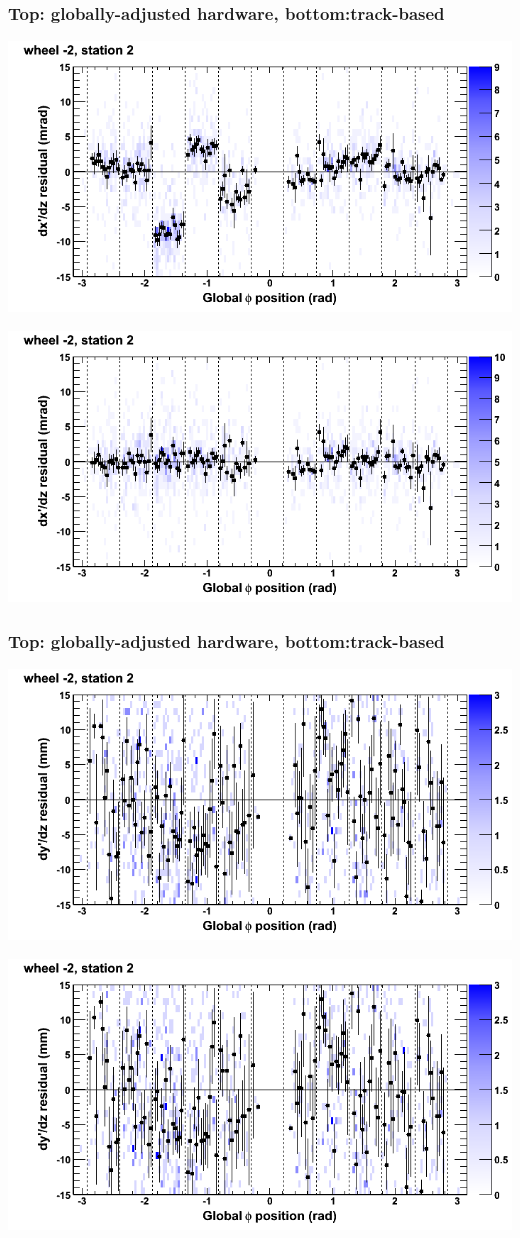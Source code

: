 \documentclass[compress]{beamer}
\begin{document}
\begin{frame}
\frametitle{Top: globally-adjusted hardware, bottom:track-based}
\includegraphics[width=0.7\linewidth]{NOV4_mapplots_HW/DTvsphi_st2whA_dxdz.png}

\includegraphics[width=0.7\linewidth]{NOV4_mapplots/DTvsphi_st2whA_dxdz.png}
\end{frame}

\begin{frame}
\frametitle{Top: globally-adjusted hardware, bottom:track-based}
\includegraphics[width=0.7\linewidth]{NOV4_mapplots_HW/DTvsphi_st2whA_dydz.png}

\includegraphics[width=0.7\linewidth]{NOV4_mapplots/DTvsphi_st2whA_dydz.png}
\end{frame}
\end{document}
